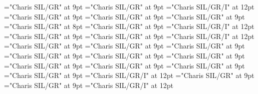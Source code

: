 \documentclass[gps1,twoside]{article}
\begin{document}
\font\sensetypesensesensessubentrysubentriesentrybefore="Charis SIL/GR" at 9pt
\font\sensetypesensesensessubentrysubentriesentryafter="Charis SIL/GR" at 9pt
\font\sensetypesensesensessubentrysubentriesentry="Charis SIL/GR/I" at 12pt
\font\spanspanabbreviationsensetypesensesensessubentrysubentriesentrybefore="Charis SIL/GR" at 9pt
\font\spanspandefinitionorglosssensesensessubentrysubentriesentrybefore="Charis SIL/GR" at 9pt
\font\spandefinitionorglosssensesensessubentrysubentriesentrylastchildafter="Charis SIL/GR" at 9pt
\font\exampleexampleexamplessensesensessubentrysubentriesentrybefore="Charis SIL/GR" at 8pt
\font\examplessensesensessubentrysubentriesentryafter="Charis SIL/GR" at 9pt
\font\spanbzhexampleexampleexamplessensesensessubentrysubentriesentry="Charis SIL/GR/I" at 12pt
\font\spanspanexampleexampleexamplessensesensessubentrysubentriesentrybefore="Charis SIL/GR" at 9pt
\font\spanexampleexampleexamplessensesensessubentrysubentriesentrylastchildafter="Charis SIL/GR" at 9pt
\font\spanexampleexampleexamplessensesensessubentrysubentriesentry="Charis SIL/GR/I" at 12pt
\font\spanspantranslationtranslationtranslationsexampleexamplessensesensessubentrysubentriesentrybefore="Charis SIL/GR" at 9pt
\font\spantranslationtranslationtranslationsexampleexamplessensesensessubentrysubentriesentrylastchildafter="Charis SIL/GR" at 9pt
\font\spanspanencyclopedicinfosensesensessubentrysubentriesentrybefore="Charis SIL/GR" at 9pt
\font\spanencyclopedicinfosensesensessubentrysubentriesentryfirstchildbefore="Charis SIL/GR" at 9pt
\font\spanencyclopedicinfosensesensessubentrysubentriesentrylastchildafter="Charis SIL/GR" at 9pt
\font\spanspanrestrictionssensesensessubentrysubentriesentrybefore="Charis SIL/GR" at 9pt
\font\spanrestrictionssensesensessubentrysubentriesentryfirstchildbefore="Charis SIL/GR" at 9pt
\font\spanrestrictionssensesensessubentrysubentriesentrylastchildafter="Charis SIL/GR" at 9pt
\font\spanspanlexsensereferencessensesensessubentrysubentriesentrybefore="Charis SIL/GR" at 9pt
\font\lexsensereferencessensesensessubentrysubentriesentryafter="Charis SIL/GR" at 9pt
\font\spanenownertypeabbreviationlexsensereferencelexsensereferencessensesensessubentrysubentriesentry="Charis SIL/GR/I" at 12pt
\font\spanspanownertypeabbreviationlexsensereferencelexsensereferencessensesensessubentrysubentriesentrybefore="Charis SIL/GR" at 9pt
\font\spanownertypeabbreviationlexsensereferencelexsensereferencessensesensessubentrysubentriesentrylastchildafter="Charis SIL/GR" at 9pt
\font\spanownertypeabbreviationlexsensereferencelexsensereferencessensesensessubentrysubentriesentry="Charis SIL/GR/I" at 12pt
\end{document}
